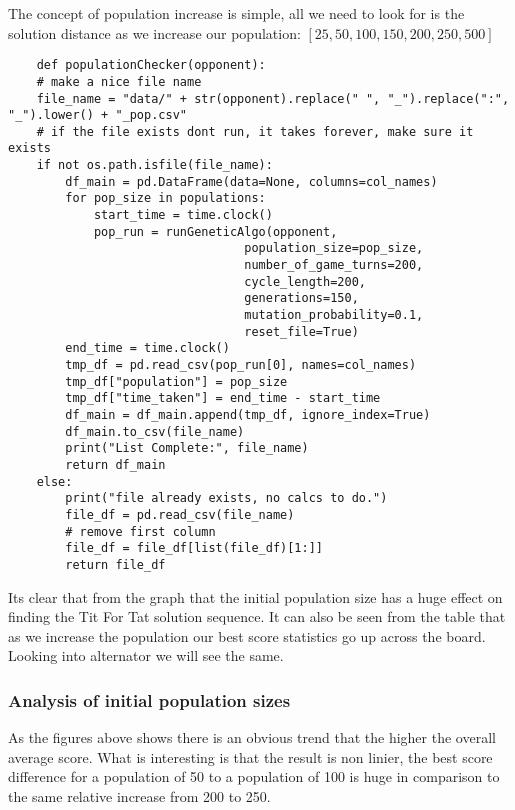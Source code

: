     The concept of population increase is simple, all we need to look for is the solution distance as we increase our population: \([25,50,100,150,200,250,500]\)

   \begin{lstlisting}    
    def populationChecker(opponent):
    # make a nice file name
    file_name = "data/" + str(opponent).replace(" ", "_").replace(":", "_").lower() + "_pop.csv"
    # if the file exists dont run, it takes forever, make sure it exists 
    if not os.path.isfile(file_name):
        df_main = pd.DataFrame(data=None, columns=col_names)
        for pop_size in populations:
            start_time = time.clock()
            pop_run = runGeneticAlgo(opponent,
                                 population_size=pop_size,
                                 number_of_game_turns=200,
                                 cycle_length=200,
                                 generations=150,
                                 mutation_probability=0.1,
                                 reset_file=True)
        end_time = time.clock()
        tmp_df = pd.read_csv(pop_run[0], names=col_names)
        tmp_df["population"] = pop_size
        tmp_df["time_taken"] = end_time - start_time
        df_main = df_main.append(tmp_df, ignore_index=True)
        df_main.to_csv(file_name)
        print("List Complete:", file_name)
        return df_main
    else:
        print("file already exists, no calcs to do.")
        file_df = pd.read_csv(file_name)
        # remove first column
        file_df = file_df[list(file_df)[1:]]
        return file_df
\end{lstlisting}
    

    Its clear that from the graph that the initial population size has a huge effect on finding the Tit For Tat solution sequence. It can also be seen from the table that as we increase the population our best score statistics go up across the board. Looking into alternator we will see the same.\\

    \subsubsection{Analysis of initial population sizes}
    
    As the figures above shows there is an obvious trend that the higher the overall average score. What is interesting is that the result is non linier, the best score difference for a population of 50 to a population of 100 is huge in comparison to the same relative increase from 200 to 250.\\

